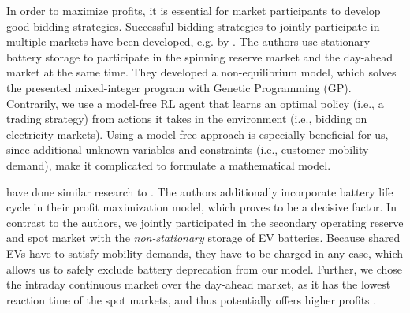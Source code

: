 \documentclass[12pt, article]{article}
\begin{document}
In order to maximize profits, it is essential for market participants to develop good
bidding strategies. Successful bidding strategies to jointly participate in
multiple markets have been developed, e.g. by
\textcite{mashhour11_biddin_strat_virtual_power_plant_2}. The authors use
stationary battery storage to participate in the spinning reserve market and
the day-ahead market at the same time. They developed a non-equilibrium model,
which solves the presented mixed-integer program with Genetic Programming (GP).
Contrarily, we use a model-free RL agent that learns an optimal policy (i.e.,
a trading strategy) from actions it takes in the environment (i.e., bidding on
electricity markets). Using a model-free approach is especially beneficial for
us, since additional unknown variables and constraints (i.e., customer mobility
demand), make it complicated to formulate a mathematical model.

\textcite{he16_optim_biddin_strat_batter_storag} have done similar research to
\textcite{mashhour11_biddin_strat_virtual_power_plant_2}. The authors additionally
incorporate battery life cycle in their profit maximization model,
which proves to be a decisive factor. In contrast to the authors, we jointly
participated in the secondary operating reserve and spot market with the
\emph{non-stationary} storage of EV batteries. Because shared EVs have to satisfy
mobility demands, they have to be charged in any case, which allows us to safely
exclude battery deprecation from our model. Further, we chose the intraday
continuous market over the day-ahead market, as it has the lowest reaction time
of the spot markets, and thus potentially offers higher profits
\parencite{tomic07_using_fleet_elect_drive_vehic_grid_suppor}.
\end{document}
